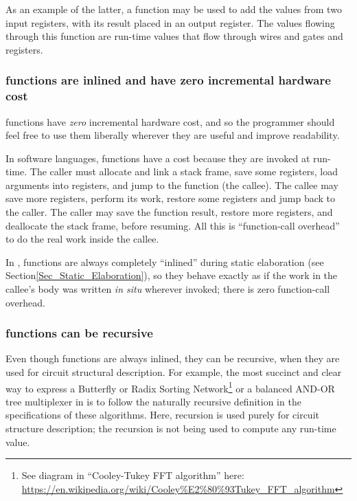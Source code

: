 As an example of the latter, a {\BSV} function may be used to add the
values from two input registers, with its result placed in an output
register.  The values flowing through this function are run-time
values that flow through wires and gates and registers.


\subsubsection{{\BSV} functions are inlined and have zero incremental hardware cost}


{\BSV} functions have \emph{zero} incremental hardware cost, and so
the programmer should feel free to use them liberally wherever they
are useful and improve readability.

In software languages, functions have a cost because they are invoked
at run-time.  The caller must allocate and link a stack frame, save
some registers, load arguments into registers, and jump to the
function (the callee).  The callee may save more registers, perform
its work, restore some registers and jump back to the caller.  The
caller may save the function result, restore more registers, and
deallocate the stack frame, before resuming.  All this is
``function-call overhead'' to do the real work inside the callee.

In {\BSV}, functions are always completely ``inlined'' during static
elaboration (see Section\ref{Sec_Static_Elaboration}), so they behave
exactly as if the work in the callee's body was written \emph{in situ}
wherever invoked; there is zero function-call overhead.


\subsubsection{{\BSV} functions can be recursive}


Even though {\BSV} functions are always inlined, they can be
recursive, when they are used for circuit structural description.  For
example, the most succinct and clear way to express a Butterfly or
Radix Sorting Network\footnote{See diagram in ``Cooley-Tukey FFT
algorithm'' here:
\url{https://en.wikipedia.org/wiki/Cooley\%E2\%80\%93Tukey_FFT_algorithm}}
or a balanced AND-OR tree multiplexer in {\BSV} is to follow the
naturally recursive definition in the specifications of these
algorithms.  Here, recursion is used purely for circuit structure
description; the recursion is not being used to compute any run-time
value.

